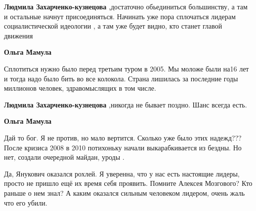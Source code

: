 \begin{itemize}
\begin{itemize}
 
\textbf{Людмила Захарченко-кузнецова} ,достаточно обьединиться большинству, а
там и остальные начнут присоединяться. Начинать уже пора сплочаться лидерам
социалистической идеологии , а там уже будет видно, кто станет главой движения

 
\textbf{Ольга Мамула} 

Сплотиться нужно было перед третьим туром в 2005. Мы
моложе были на16 лет и тогда надо было бить во все колокола. Страна лишилась за
последние годы миллионов человек, здравомыслящих в том числе.

 
\textbf{Людмила Захарченко-кузнецова} ,никогда не бывает поздно. Шанс всегда есть.

 
\textbf{Ольга Мамула} 

Дай то бог. Я не против, но мало вертится. Сколько уже было
этих надежд??? После кризиса 2008 в 2010 потихоньку начали выкарабкивается из
бездны. Но нет, создали очередной майдан, уроды .


 

Да, Янукович оказался рохлей. Я уверенна, что у нас есть настоящие лидеры,
просто не пришло ещё их время себя проявить. Помните Алексея Мозгового? Кто
раньше о нем знал? А каким оказался сильным человеком лидером, очень жаль что
его убили.


\end{itemize}
\end{itemize}
